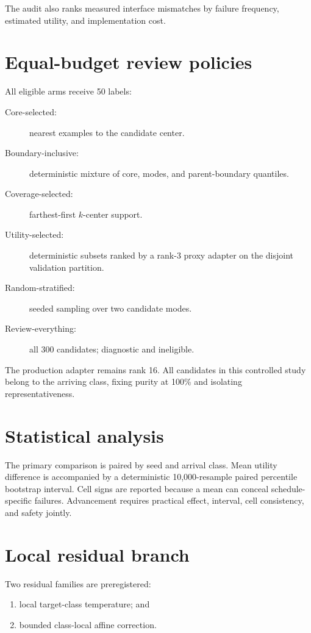 \documentclass[12pt,oneside]{report}
\begin{document}
The audit also ranks measured interface mismatches by failure frequency,
estimated utility, and implementation cost.

\section{Equal-budget review policies}

All eligible arms receive 50 labels:

\begin{description}
\item[Core-selected:] nearest examples to the candidate center.
\item[Boundary-inclusive:] deterministic mixture of core, modes, and
parent-boundary quantiles.
\item[Coverage-selected:] farthest-first $k$-center support.
\item[Utility-selected:] deterministic subsets ranked by a rank-3 proxy adapter
on the disjoint validation partition.
\item[Random-stratified:] seeded sampling over two candidate modes.
\item[Review-everything:] all 300 candidates; diagnostic and ineligible.
\end{description}

The production adapter remains rank 16. All candidates in this controlled
study belong to the arriving class, fixing purity at 100\% and isolating
representativeness.

\section{Statistical analysis}

The primary comparison is paired by seed and arrival class. Mean utility
difference is accompanied by a deterministic 10,000-resample paired percentile
bootstrap interval. Cell signs are reported because a mean can conceal
schedule-specific failures. Advancement requires practical effect, interval,
cell consistency, and safety jointly.

\section{Local residual branch}

Two residual families are preregistered:

\begin{enumerate}
\item local target-class temperature; and
\item bounded class-local affine correction.
\end{enumerate}
\end{document}
